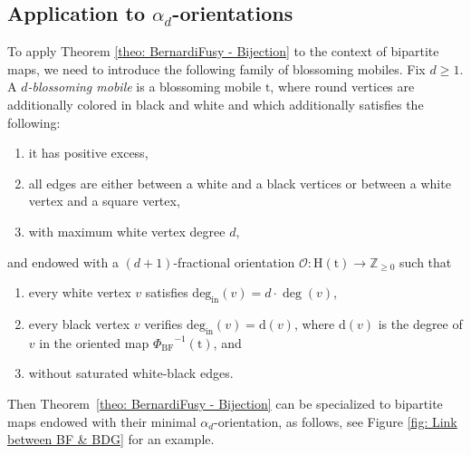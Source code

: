 \documentclass[11pt,reqno,tbtags]{amsart}
\newcommand{\rt}{\mathrm{t}}
\numberwithin{equation}{section}
\numberwithin{theo}{section}
\theoremstyle{definition}
\newcommand{\cO}{\mathcal{O}}
\newcommand{\ind}{\mathrm{deg_{in}}}
\begin{document}
\subsection{Application to \texorpdfstring{$\alpha_d$}{alpha}-orientations}\label{sub:BF_application_to_alpha_d_} To apply Theorem \ref{theo: BernardiFusy - Bijection} to the context of bipartite maps, we need to introduce the following family of blossoming mobiles.
Fix $d\geq 1$. A \emph{$d$-blossoming mobile} is a blossoming mobile $\rt$, where round vertices are additionally colored in black and white and which additionally satisfies the following: 
\begin{enumerate}[(1)]
	\item it has positive excess,
	\item all edges are either between a white and a black vertices or between a white vertex and a square vertex,
	\item with maximum white vertex degree $d$,
\end{enumerate}
and endowed with a $(d+1)$-fractional orientation $\cO : \mathrm{H}(\rt) \rightarrow \mathbb{Z}_{\geq 0}$ such that
\begin{enumerate}[resume]
	\item every white vertex $v$ satisfies $\ind(v)=d\cdot\deg(v)$,
	\item every black vertex $v$ verifies $\ind(v)=\mathrm{d}(v)$, where  $\mathrm{d}(v)$ is the degree of $v$ in the oriented map ${\Phi_{\mathrm{BF}}}^{-1}(\rt)$, and
	\item without saturated white-black edges.
\end{enumerate}

Then Theorem~\ref{theo: BernardiFusy - Bijection} can be specialized to bipartite maps endowed with their minimal $\alpha_d$-orientation, as follows, see Figure \ref{fig: Link between BF & BDG} for an example. 
\end{document}
